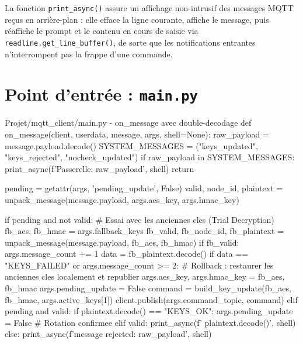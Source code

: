 \documentclass[a4paper,11pt]{report}
\begin{document}
La fonction \texttt{print\_async()} assure un affichage non-intrusif des messages MQTT reçus en arrière-plan :
elle efface la ligne courante, affiche le message, puis réaffiche le prompt et le contenu en cours de saisie
via \texttt{readline.get\_line\_buffer()}, de sorte que les notifications entrantes n'interrompent pas la
frappe d'une commande.

\section{Point d'entrée : \texttt{main.py}}

\begin{pycode}{Projet/mqtt\_client/main.py - on\_message avec double-decodage}
def on_message(client, userdata, message, args, shell=None):
    raw_payload = message.payload.decode()
    SYSTEM_MESSAGES = ("keys_updated", "keys_rejected", "nocheck_updated")
    if raw_payload in SYSTEM_MESSAGES:
        print_async(f'\n[SYSTEM] Passerelle: {raw_payload}', shell)
        return

    pending = getattr(args, 'pending_update', False)
    valid, node_id, plaintext = unpack_message(message.payload, args.aes_key, args.hmac_key)

    if pending and not valid:
        # Essai avec les anciennes cles (Trial Decryption)
        fb_aes, fb_hmac = args.fallback_keys
        fb_valid, fb_node_id, fb_plaintext = unpack_message(message.payload, fb_aes, fb_hmac)
        if fb_valid:
            args.message_count += 1
            data = fb_plaintext.decode()
            if data == "KEYS_FAILED" or args.message_count >= 2:
                # Rollback : restaurer les anciennes cles localement et republier
                args.aes_key, args.hmac_key = fb_aes, fb_hmac
                args.pending_update = False
                command = build_key_update(fb_aes, fb_hmac, args.active_keys[1])
                client.publish(args.command_topic, command)
    elif pending and valid:
        if plaintext.decode() == "KEYS_OK":
            args.pending_update = False  # Rotation confirmee
    elif valid:
        print_async(f' {plaintext.decode()}', shell)
    else:
        print_async(f'\n[BAD] message rejected\nraw: {raw_payload}', shell)
\end{pycode}
\end{document}
